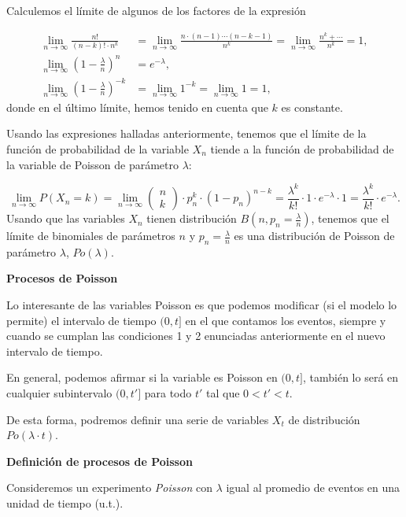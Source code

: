 \documentclass[
  letterpaper,
  DIV=11,
  numbers=noendperiod]{scrreprt}
\begin{document}
Calculemos el límite de algunos de los factores de la expresión

\[
\begin{array}{rl}
\lim\limits_{n\to \infty}\frac{n!}{(n-k)!\cdot n^k} & = \lim\limits_{n\to \infty}\frac{n\cdot (n-1)\cdots (n-k-1)}{n^k}
=\lim\limits_{n\to \infty}\frac{n^{k}+\cdots}{n^k}=1, \\
\lim\limits_{n\to \infty} \left(1-\frac{\lambda}{n}\right)^{n} & =e^{-\lambda},\\
\lim\limits_{n\to \infty} \left(1-\frac{\lambda}{n}\right)^{-k} & =\lim\limits_{n\to \infty} 1^{-k}=\lim\limits_{n\to \infty}  1=1,
\end{array}
\] donde en el último límite, hemos tenido en cuenta que \(k\) es
constante.

Usando las expresiones halladas anteriormente, tenemos que el límite de
la función de probabilidad de la variable \(X_n\) tiende a la función de
probabilidad de la variable de Poisson de parámetro \(\lambda\):

\[
\displaystyle\lim_{n\to\infty} P(X_n=k)=
\lim_{n\to\infty} \left(\begin{array}{c} n\\ k\end{array}\right)
\cdot p_n^k \cdot (1-p_n)^{n-k}= \frac{\lambda^k}{k!}\cdot 1 \cdot e^{-\lambda}\cdot 1=\frac{\lambda^k}{k!}\cdot e^{-\lambda}.
\] Usando que las variables \(X_n\) tienen distribución
\(B(n,p_n=\frac{\lambda}{n})\), tenemos que el límite de binomiales de
parámetros \(n\) y \(p_n=\frac{\lambda}{n}\) es una distribución de
Poisson de parámetro \(\lambda\), \(Po(\lambda)\).

\textbf{Procesos de Poisson}

Lo interesante de las variables Poisson es que podemos modificar (si el
modelo lo permite) el intervalo de tiempo \((0,t]\) en el que contamos
los eventos, siempre y cuando se cumplan las condiciones 1 y 2
enunciadas anteriormente en el nuevo intervalo de tiempo.

En general, podemos afirmar si la variable es Poisson en \((0,t]\),
también lo será en cualquier subintervalo \((0,t']\) para todo \(t'\)
tal que \(0<t'<t\).

De esta forma, podremos definir una serie de variables \(X_t\) de
distribución \(Po(\lambda\cdot t)\).

\textbf{Definición de procesos de Poisson}

Consideremos un experimento \emph{Poisson} con \(\lambda\) igual al
promedio de eventos en una unidad de tiempo (u.t.).
\end{document}
